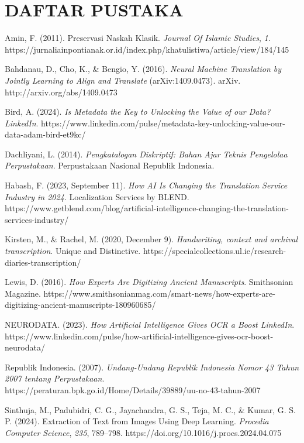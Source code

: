 \documentclass[
]{article}
\begin{document}
\hypertarget{section-8}{%
\section{\texorpdfstring{\hfill\break
}{ }}\label{section-8}}

\hypertarget{daftar-pustaka}{%
\section{DAFTAR PUSTAKA}\label{daftar-pustaka}}

Amin, F. (2011). Preservasi Naskah Klasik. \emph{Journal Of Islamic
Studies}, \emph{1}.
https://jurnaliainpontianak.or.id/index.php/khatulistiwa/article/view/184/145

Bahdanau, D., Cho, K., \& Bengio, Y. (2016). \emph{Neural Machine
Translation by Jointly Learning to Align and Translate}
(arXiv:1409.0473). arXiv. http://arxiv.org/abs/1409.0473

Bird, A. (2024). \emph{Is Metadata the Key to Unlocking the Value of our
Data? \textbar{} LinkedIn}.
https://www.linkedin.com/pulse/metadata-key-unlocking-value-our-data-adam-bird-et9kc/

Dachliyani, L. (2014). \emph{Pengkatalogan Diskriptif: Bahan Ajar Teknis
Pengelolaa Perpustakaan}. Perpustakaan Nasional Republik Indonesia.

Habash, F. (2023, September 11). \emph{How AI Is Changing the
Translation Service Industry in 2024}. Localization Services by BLEND.
https://www.getblend.com/blog/artificial-intelligence-changing-the-translation-services-industry/

Kirsten, M., \& Rachel, M. (2020, December 9). \emph{Handwriting,
context and archival transcription}. Unique and Distinctive.
https://specialcollections.ul.ie/research-diaries-transcription/

Lewis, D. (2016). \emph{How Experts Are Digitizing Ancient Manuscripts}.
Smithsonian Magazine.
https://www.smithsonianmag.com/smart-news/how-experts-are-digitizing-ancient-manuscripts-180960685/

NEURODATA. (2023). \emph{How Artificial Intelligence Gives OCR a Boost
\textbar{} LinkedIn}.
https://www.linkedin.com/pulse/how-artificial-intelligence-gives-ocr-boost-neurodata/

Republik Indonesia. (2007). \emph{Undang-Undang Republik Indonesia Nomor
43 Tahun 2007 tentang Perpustakaan}.
https://peraturan.bpk.go.id/Home/Details/39889/uu-no-43-tahun-2007

Sinthuja, M., Padubidri, C. G., Jayachandra, G. S., Teja, M. C., \&
Kumar, G. S. P. (2024). Extraction of Text from Images Using Deep
Learning. \emph{Procedia Computer Science}, \emph{235}, 789--798.
https://doi.org/10.1016/j.procs.2024.04.075
\end{document}
